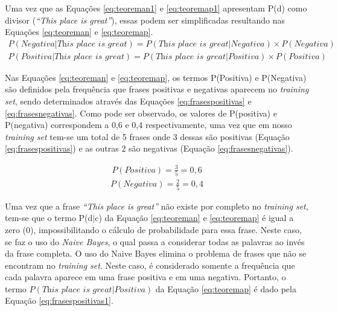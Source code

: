 Uma vez que as Equações \ref{eq:teoreman1} e \ref{eq:teoremap1}
apresentam P(d) como divisor (\textit{``This place is great''}), essas podem ser
simplificadas resultando nas Equações \ref{eq:teoreman} e \ref{eq:teoremap}.
\begin{equation}
\begin{gathered}
P(Negativa|\textit{This place is great})
=
P(\textit{This place is great}|Negativa) \times
P(Negativa)
\label{eq:teoreman}
\end{gathered}
\end{equation}
\begin{equation}
\begin{gathered}
P(Positiva|\textit{This place is great})
=
P(\textit{This place is great}|Positiva) \times
P(Positiva)
\label{eq:teoremap}
\end{gathered}
\end{equation}



Nas Equações \ref{eq:teoreman} e \ref{eq:teoremap}, os termos P(Positiva) e
P(Negativa) são definidos pela frequência que frases positivas e negativas aparecem no \textit{training set}, sendo determinados
através das Equações \ref{eq:frasespositivas} e \ref{eq:frasesnegativas}. Como
pode ser observado, os valores de P(positiva) e P(negativa) correspondem a 0,6
e 0,4 respectivamente, uma vez que em nosso \textit{training set} tem-se um
total de 5 frases onde 3 dessas são positivas (Equação \ref{eq:frasespositivas})
e as outras 2 são negativas (Equação \ref{eq:frasesnegativas}).

\begin{equation}
\begin{gathered}
P(Positiva)
=
\frac{3}{5} = 0,6
\label{eq:frasespositivas}
\end{gathered}
\end{equation}
\begin{equation}
\begin{gathered}
P(Negativa)
=
\frac{2}{5} = 0,4
\label{eq:frasesnegativas}
\end{gathered}
\end{equation}

Uma vez que a frase \textit{``This place is great''} não existe por completo no
\textit{training set}, tem-se que o termo P(d$\vert$c) da Equação
\ref{eq:teoreman} e \ref{eq:teoremap} é igual a zero (0), impossibilitando o
cálculo de probabilidade para essa frase. Neste caso, se faz o uso do
\textit{Naive Bayes}, o qual passa a considerar todas as palavras ao invés da
frase completa. O uso do Naive Bayes elimina o problema de frases que não se
encontram no \textit{training set}. Neste caso, é considerado somente a
frequência que cada palavra aparece em uma frase positiva e em uma negativa.
Portanto, o termo $P(\textit{This place is
great}|Positiva)$ da Equação \ref{eq:teoremap} é dado pela Equação
\ref{eq:frasespositivas1}.

